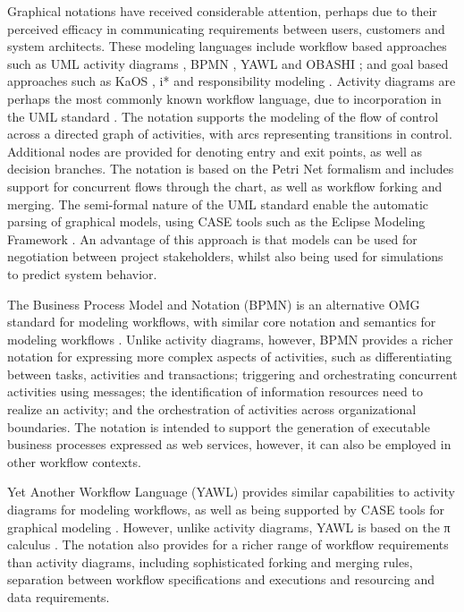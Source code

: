 \documentclass{llncs}
\begin{document}
Graphical notations have received considerable attention, perhaps due to their perceived efficacy in communicating
requirements between users, customers and system architects.  These modeling languages include workflow based approaches
such as UML activity diagrams \cite{omg07omguml}, BPMN \cite{omg2011omgbpmn}, YAWL \cite{hofstede2010yawl} and OBASHI
\cite{obashimethodology}; and goal based approaches such as KaOS \cite{werneck2009goreistarkaos}, i* \cite{yu1995social} and responsibility
modeling \cite{sommerville09responsibility}.  Activity diagrams are perhaps the most commonly known workflow
language, due to incorporation in the UML standard \cite{omg07omguml}.  The notation supports the modeling of the flow of
control across a directed graph of activities, with arcs representing transitions in control.  Additional nodes are
provided for denoting entry and exit points, as well as decision branches.  The notation is based on the Petri Net
formalism and includes support for concurrent flows through the chart, as well as workflow forking and merging. The
semi-formal nature of the UML standard enable the automatic parsing of graphical models, using CASE tools such as the
Eclipse Modeling Framework \cite{emfmanual}.  An advantage of this approach is that models can be used for
negotiation between project stakeholders, whilst also being used for simulations to predict system behavior.

The Business Process Model and Notation (BPMN) is an alternative OMG standard for modeling workflows,
with similar core notation and semantics for modeling workflows \cite{omg2011omgbpmn}.  Unlike activity diagrams, however,
BPMN provides a richer notation for expressing more complex aspects of activities, such as differentiating between
tasks, activities and transactions; triggering and orchestrating concurrent activities using messages; the
identification of information resources need to realize an activity; and the orchestration of activities across
organizational boundaries\cite{white2004bpmn}.  The notation is intended to support the generation of executable business
processes expressed as web services, however, it can also be employed in other workflow contexts.

Yet Another Workflow Language (YAWL) provides similar capabilities to activity diagrams for modeling workflows, as well
as being supported by CASE tools for graphical modeling \cite{hofstede2010yawl}.  However, unlike activity diagrams,
YAWL is based on the π calculus \cite{aalst2004workflow}.  The notation also provides for a richer range of workflow requirements
than activity diagrams, including sophisticated forking and merging rules, separation between workflow specifications
and executions and resourcing and data requirements.
\end{document}
